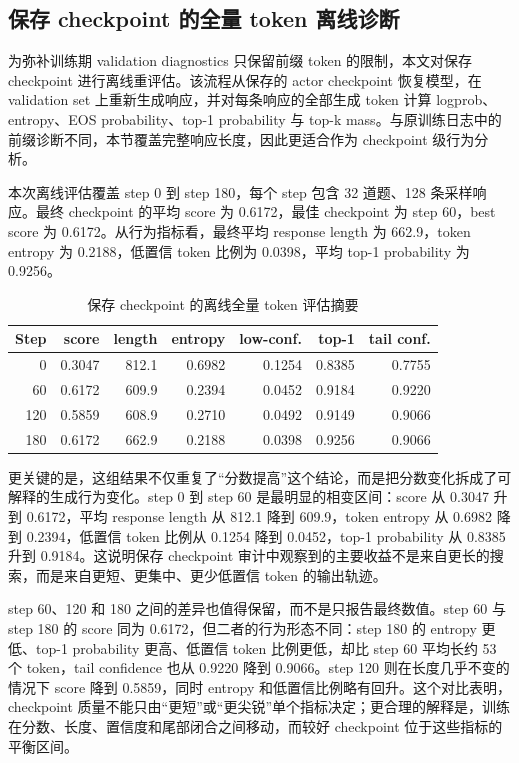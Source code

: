 \subsection{保存 checkpoint 的全量 token 离线诊断}

为弥补训练期 validation diagnostics 只保留前缀 token 的限制，本文对保存 checkpoint 进行离线重评估。该流程从保存的 actor checkpoint 恢复模型，在 \EvalSet{} validation set 上重新生成响应，并对每条响应的全部生成 token 计算 logprob、entropy、EOS probability、top-1 probability 与 top-k mass。与原训练日志中的前缀诊断不同，本节覆盖完整响应长度，因此更适合作为 checkpoint 级行为分析。

本次离线评估覆盖 step 0 到 step 180，每个 step 包含 32 道题、128 条采样响应。最终 checkpoint 的平均 score 为 0.6172，最佳 checkpoint 为 step 60，best score 为 0.6172。从行为指标看，最终平均 response length 为 662.9，token entropy 为 0.2188，低置信 token 比例为 0.0398，平均 top-1 probability 为 0.9256。

\begin{table}[H]
    \centering
    \caption{保存 checkpoint 的离线全量 token 评估摘要}
    \label{tab:full-token-ckpt-audit}
    \small
    \setlength{\tabcolsep}{4pt}
    \begin{tabular}{rrrrrrr}
        \toprule
        Step & score & length & entropy & low-conf. & top-1 & tail conf. \\
        \midrule
        0 & 0.3047 & 812.1 & 0.6982 & 0.1254 & 0.8385 & 0.7755 \\
        60 & 0.6172 & 609.9 & 0.2394 & 0.0452 & 0.9184 & 0.9220 \\
        120 & 0.5859 & 608.9 & 0.2710 & 0.0492 & 0.9149 & 0.9066 \\
        180 & 0.6172 & 662.9 & 0.2188 & 0.0398 & 0.9256 & 0.9066 \\
        \bottomrule
    \end{tabular}
\end{table}

更关键的是，这组结果不仅重复了“分数提高”这个结论，而是把分数变化拆成了可解释的生成行为变化。step 0 到 step 60 是最明显的相变区间：score 从 0.3047 升到 0.6172，平均 response length 从 812.1 降到 609.9，token entropy 从 0.6982 降到 0.2394，低置信 token 比例从 0.1254 降到 0.0452，top-1 probability 从 0.8385 升到 0.9184。这说明保存 checkpoint 审计中观察到的主要收益不是来自更长的搜索，而是来自更短、更集中、更少低置信 token 的输出轨迹。

step 60、120 和 180 之间的差异也值得保留，而不是只报告最终数值。step 60 与 step 180 的 score 同为 0.6172，但二者的行为形态不同：step 180 的 entropy 更低、top-1 probability 更高、低置信 token 比例更低，却比 step 60 平均长约 53 个 token，tail confidence 也从 0.9220 降到 0.9066。step 120 则在长度几乎不变的情况下 score 降到 0.5859，同时 entropy 和低置信比例略有回升。这个对比表明，checkpoint 质量不能只由“更短”或“更尖锐”单个指标决定；更合理的解释是，训练在分数、长度、置信度和尾部闭合之间移动，而较好 checkpoint 位于这些指标的平衡区间。

